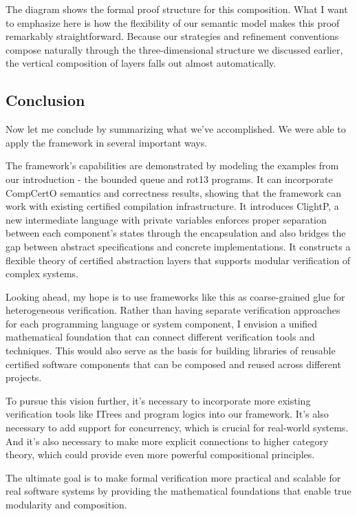 \documentclass{article}
\begin{document}
The diagram shows the formal proof structure for this composition. What I want
to emphasize here is how the flexibility of our semantic model makes this proof
remarkably straightforward. Because our strategies and refinement conventions
compose naturally through the three-dimensional structure we discussed earlier,
the vertical composition of layers falls out almost automatically.

\subsection{Conclusion}

Now let me conclude by summarizing what we've accomplished. We were able to
apply the framework in several important ways.

The framework's capabilities are demonstrated by modeling the examples from our
introduction - the bounded queue and rot13 programs. It can incorporate
CompCertO semantics and correctness results, showing that the framework can work
with existing certified compilation infrastructure. It introduces ClightP, a new
intermediate language with private variables enforces proper separation between
each component's states through the encapsulation and also bridges the gap
between abstract specifications and concrete implementations. It constructs
a flexible theory of certified abstraction layers that supports modular
verification of complex systems.

Looking ahead, my hope is to use frameworks like this as coarse-grained glue
for heterogeneous verification. Rather than having separate verification
approaches for each programming language or system component, I envision a
unified mathematical foundation that can connect different verification tools
and techniques. This would also serve as the basis for building libraries of
reusable certified software components that can be composed and reused across
different projects.

To pursue this vision further, it's necessary to incorporate more existing
verification tools like ITrees and program logics into our framework. It's also
necessary to add support for concurrency, which is crucial for real-world
systems. And it's also necessary to make more explicit connections to higher
category theory, which could provide even more powerful compositional
principles.

The ultimate goal is to make formal verification more practical and scalable for
real software systems by providing the mathematical foundations that enable true
modularity and composition.
\end{document}
